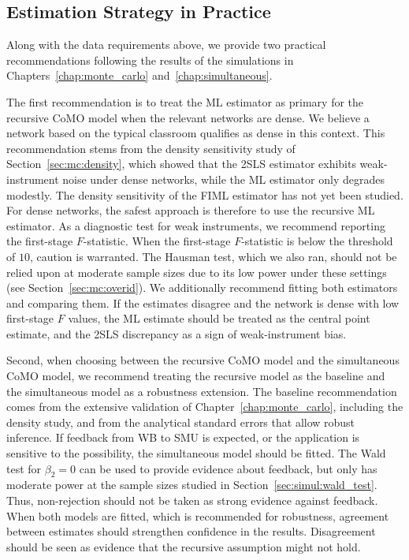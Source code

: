 \subsection{Estimation Strategy in Practice}
\label{sec:discussion_conclusion:estimation_strategy}
Along with the data requirements above, we provide two practical recommendations following the results of the simulations in Chapters~\ref{chap:monte_carlo} and~\ref{chap:simultaneous}.

The first recommendation is to treat the ML estimator as primary for the recursive CoMO model when the relevant networks are dense. We believe a network based on the typical classroom qualifies as dense in this context. This recommendation stems from the density sensitivity study of Section~\ref{sec:mc:density}, which showed that the 2SLS estimator exhibits weak-instrument noise under dense networks, while the ML estimator only degrades modestly. The density sensitivity of the FIML estimator has not yet been studied. For dense networks, the safest approach is therefore to use the recursive ML estimator. As a diagnostic test for weak instruments, we recommend reporting the first-stage $F$-statistic. When the first-stage $F$-statistic is below the \textcite[p.~557]{Staiger1997} threshold of $10$, caution is warranted. The Hausman test, which we also ran, should not be relied upon at moderate sample sizes due to its low power under these settings (see Section~\ref{sec:mc:overid}). We additionally recommend fitting both estimators and comparing them. If the estimates disagree and the network is dense with low first-stage $F$ values, the ML estimate should be treated as the central point estimate, and the 2SLS discrepancy as a sign of weak-instrument bias.

Second, when choosing between the recursive CoMO model and the simultaneous CoMO model, we recommend treating the recursive model as the baseline and the simultaneous model as a robustness extension. The baseline recommendation comes from the extensive validation of Chapter~\ref{chap:monte_carlo}, including the density study, and from the analytical standard errors that allow robust inference. If feedback from WB to SMU is expected, or the application is sensitive to the possibility, the simultaneous model should be fitted. The Wald test for $\beta_2 = 0$ can be used to provide evidence about feedback, but only has moderate power at the sample sizes studied in Section~\ref{sec:simul:wald_test}. Thus, non-rejection should not be taken as strong evidence against feedback. When both models are fitted, which is recommended for robustness, agreement between estimates should strengthen confidence in the results. Disagreement should be seen as evidence that the recursive assumption might not hold.

